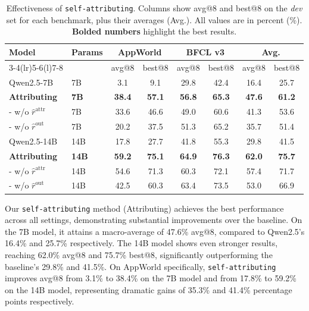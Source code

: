 \begin{table}[h]
\centering
\caption{Effectiveness of \texttt{self-attributing}. Columns show avg@8 and best@8 on the \emph{dev} set for each benchmark, plus their averages (Avg.). All values are in percent (\%). \textbf{Bolded numbers} highlight the best results.}
\label{tab:attributing_Effectiveness}
\small
\setlength{\tabcolsep}{8pt}
\begin{tabular}{@{}ll cc cc cc@{}}
\toprule
\textbf{Model} & \textbf{Params} &
\multicolumn{2}{c}{\textbf{AppWorld}} &
\multicolumn{2}{c}{\textbf{BFCL v3}} &
\multicolumn{2}{c}{\textbf{Avg.}} \\
\cmidrule(lr){3-4}\cmidrule(lr){5-6}\cmidrule(l){7-8}
 & &
avg@8 & best@8  &
avg@8  & best@8  &
avg@8  & best@8  \\
\midrule
Qwen2.5-7B   & 7B   & 3.1 & 9.1 & 29.8 & 42.4 & 16.4 & 25.7  \\
\rowcolor{gray!20}
\textbf{Attributing } & \textbf{7B} & \textbf{38.4} & \textbf{57.1} & \textbf{56.8} & \textbf{65.3} & \textbf{47.6} & \textbf{61.2} \\
 - w/o $\hat{r}^{\text{attr}}$  & 7B & 33.6 & 46.6 & 49.0 & 60.6 & 41.3 & {53.6} \\
 - w/o $\hat{r}^{\text{out}}$ & 7B & 20.2 & 37.5 & 51.3 & 65.2 & {35.7} & {51.4} \\
\midrule
Qwen2.5-14B   & 14B   & 17.8 & 27.7 & 41.8 & 55.3 & 29.8 & 41.5  \\
\rowcolor{gray!20}
\textbf{Attributing} & \textbf{14B} & \textbf{59.2} & \textbf{75.1} & \textbf{64.9} & \textbf{76.3} & \textbf{62.0} & \textbf{75.7} \\
 - w/o $\hat{r}^{\text{attr}}$ & 14B & 54.6 & 71.3 & 60.3 & 72.1 & 57.4 & 71.7 \\
 - w/o $\hat{r}^{\text{out}}$ & 14B &  42.5 & 60.3 & 63.4 & 73.5 & {53.0} & {66.9} \\

\bottomrule
\end{tabular}
\end{table}



Our \texttt{self-attributing} method (Attributing) achieves the best performance across all settings, demonstrating substantial improvements over the baseline. On the 7B model, it attains a macro-average of 47.6\% avg@8, compared to {Qwen2.5}'s 16.4\% and 25.7\% respectively. The 14B model shows even stronger results, reaching 62.0\% avg@8 and 75.7\% best@8, significantly outperforming the baseline's 29.8\% and 41.5\%. On AppWorld specifically, \texttt{self-attributing} improves avg@8 from 3.1\% to 38.4\% on the 7B model and from 17.8\% to 59.2\% on the 14B model, representing dramatic gains of 35.3\% and 41.4\% percentage points respectively.

